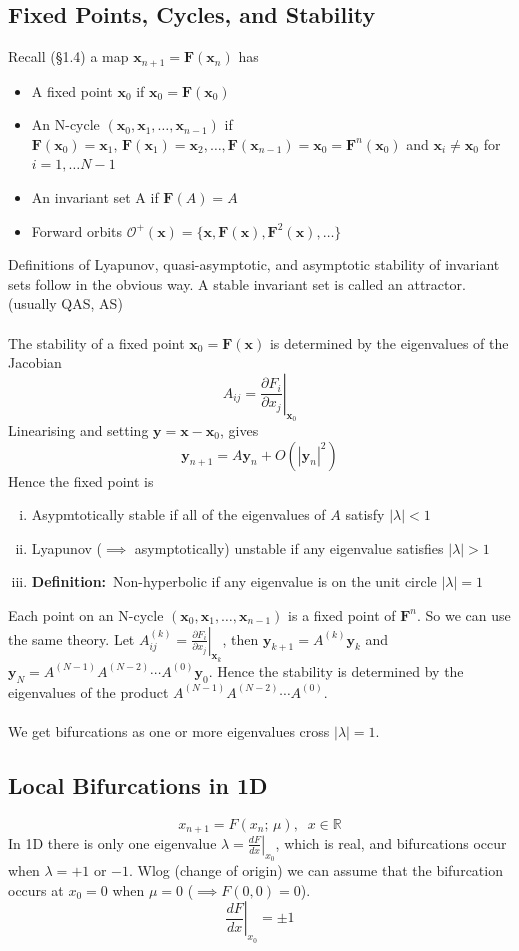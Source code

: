 \documentclass{article}
\newcommand{\cO}{\mathcal{O}}                               %
\newcommand{\definition}{\textbf{Definition:}}              %
\newcommand{\bx}{\bm{x}}                                    %
\newcommand{\pder}[2] {\frac{\partial {#1}}{\partial {#2} }}%
\begin{document}
\subsection{Fixed Points, Cycles, and Stability}
Recall (\S 1.4) a map $\bx_{n+1} = \bm{F}(\bx_n)$ has 
\begin{itemize}
\item A fixed point $\bx_0$ if $\bx_0 = \bm{F}(\bx_0)$
\item An N-cycle $(\bx_0,\bx_1, \dots , \bx_{n-1})$ if $ \bm{F}(\bx_0) = \bx_1
      , \, \bm{F}(\bx_1) = \bx_2 , \dots , \bm{F}(\bx_{n-1}) =\bx_0 = 
      \bm{F}^n(\bx_0) $ and $\bx_i \neq \bx_0$ for $i = 1, \dots N-1$
\item An invariant set A if $\bm{F}(A) = A$
\item Forward orbits $\cO^+(\bx) = \{\bx, \bm{F}(\bx), \bm{F}^2(\bx), \dots \}$
\end{itemize}
Definitions of Lyapunov, quasi-asymptotic, and asymptotic stability of 
invariant sets follow in the obvious way. A stable invariant set is called 
an attractor. (usually QAS, AS)
\\
\\
The stability of a fixed point $\bx_0 = \bm{F}(\bx)$ is determined by the 
eigenvalues of the Jacobian
\[ A_{ij} = \left. \pder{F_i}{x_j} \right|_{\bx_0} \]
Linearising and setting $\bm{y} = \bx - \bx_0$, gives
\[ \bm{y}_{n+1} = A \bm{y}_n + O(|\bm{y}_n|^2)\]
Hence the fixed point is 
\begin{enumerate}[(i)]
\item Asypmtotically stable if all of the eigenvalues of $A$ satisfy 
      $|\lambda|<1$
\item Lyapunov ($\implies$ asymptotically) unstable if any eigenvalue satisfies
      $|\lambda|>1$
\item \definition\ Non-hyperbolic if any eigenvalue is on the unit circle 
      $|\lambda| =1$
\end{enumerate}
Each point on an N-cycle $(\bx_0,\bx_1, \dots , \bx_{n-1})$ is a fixed
point of $\bm{F}^n$. So we can use the same theory.
Let $\displaystyle A_{ij}^{(k)} = \left. \pder{F_i}{x_j} \right|_{\bx_k}$,
then $\bm{y}_{k+1} = A^{(k)} \bm{y}_k$ and $\bm{y}_N = A^{(N-1)}A^{(N-2)}\cdots
A^{(0)} \bm{y}_0$. Hence the stability is determined by the eigenvalues of the 
product $ A^{(N-1)}A^{(N-2)}\cdots A^{(0)}$.
\\
\\
We get bifurcations as one or more eigenvalues cross $|\lambda|=1$.
\subsection{Local Bifurcations in 1D}
\[ x_{n+1} = F(x_n ; \, \mu) , \;\; x \in \mathbb{R} \]
In 1D there is only one eigenvalue $\displaystyle \lambda = \left. 
\frac{dF}{dx} \right|_{x_0}$, which is real, and bifurcations occur when
$\lambda = +1$ or $-1$. Wlog (change of origin) we can assume that the 
bifurcation occurs at $x_0=0$ when $\mu=0$ ($\implies F(0,0)=0$).
\[ \left. \frac{dF}{dx} \right|_{x_0} = \pm 1 \]
%
\end{document}
